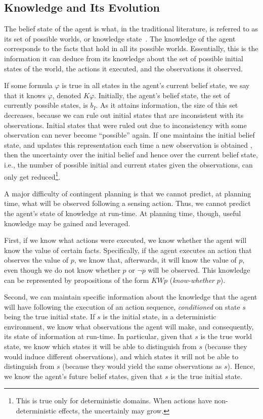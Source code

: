 \documentclass[letterpaper]{article}
\numberwithin{equation}{section}	%
\newcommand{\commentout}[1]{}
\begin{document}
\subsection{Knowledge and Its Evolution}
The belief state of the agent is what, in the traditional literature, is referred to as its set of possible worlds, or knowledge state~\citep{FHMV94}.
The knowledge of the agent corresponds to the facts that hold in all its possible worlds.
Essentially, this is the information it can deduce from its knowledge about the set of possible initial states of the world, the actions it  executed, and the observations it observed.

If some formula $\varphi$ is true in all states in the agent's current
belief state, we say that it knows $\varphi$, denoted $K\varphi$.
Initially, the agent's belief state, the set of currently possible states, is $b_I$. As it attains information, the size of this set decreases, because we can rule out initial
states that are inconsistent with its observations. Initial states that were ruled out due to inconsistency with some observation can never become ``possible'' again. If one maintains the initial belief state, and updates this representation each time a new observation is obtained \citep{SDR}, then the uncertainty over the initial belief and hence over the current belief state, i.e., the number of possible initial and current states given the observations, can only get reduced\footnote{This is true only for deterministic domains. When actions have non-deterministic effects, the uncertainly may grow.}.

A major difficulty of contingent planning is that we cannot predict, at planning time, what will be observed following a sensing action. Thus, we cannot predict the agent's state of knowledge at run-time. At planning time, though, useful knowledge may be gained and leveraged.

First, if we know what actions were executed, we know whether the agent will know the value of certain facts.
Specifically, if the agent executes an action that observes the value of $p$, we know that, afterwards,  it will know the value of $p$, even though we do not know whether $p$ or $\neg p$ will be observed.
This knowledge can be represented by propositions of the form $KWp$ (\emph{know-whether} $p$).
\commentout{
Notice that if we know that the agent will
know the value of $p$ and we know that the value of $p$ is {\em true}, then we know that the agent will know "$p$  is true."
That is $KWp \wedge p \rightarrow Kp$.
}
Second, we can maintain specific information about the knowledge that the agent will
have following the execution of an action sequence, \emph{conditioned} on state $s$ being the true initial state.
If $s$ is the initial state, in a deterministic environment, we know what observations the agent will make,
and consequently, its state of information at run-time. In particular, given that $s$ is the true world state, we know which states
it will be able to distinguish from $s$ (because they would induce different observations), and which states it will not be able to distinguish from $s$ (because they would yield the same observations as $s$). Hence, we know the agent's future belief states, given that $s$ is the true initial state.
\end{document}
